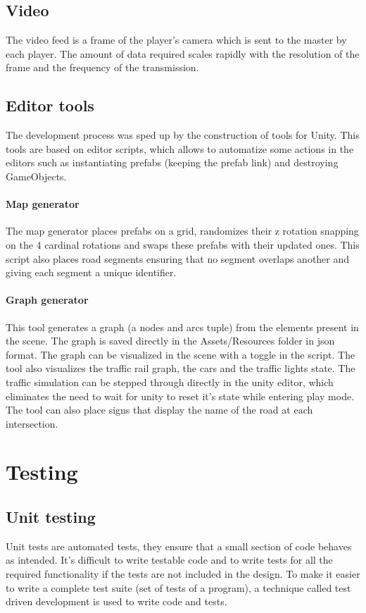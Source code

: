 \documentclass[12pt]{article}
\begin{document}
\subsection{Video}
The video feed is a frame of the player's camera which is sent to the master by each player. The amount of data required scales rapidly with the resolution of the frame and the frequency of the transmission.

\subsection{Editor tools}
The development process was sped up by the construction of tools for Unity. This tools are based on editor scripts, which allows to automatize some actions in the editors such as instantiating prefabs (keeping the prefab link) and destroying GameObjects.
\paragraph{Map generator}
The map generator places prefabs on a grid, randomizes their z rotation snapping on the 4 cardinal rotations and swaps these prefabs with their updated ones. This script also places road segments ensuring that no segment overlaps another and giving each segment a unique identifier.
\paragraph{Graph generator}
This tool generates a graph (a nodes and arcs tuple) from the elements present in the scene. The graph is saved directly in the Assets/Resources folder in json format. The graph can be visualized in the scene with a toggle in the script. The tool also visualizes the traffic rail graph, the cars and the traffic lights state. The traffic simulation can be stepped through directly in the unity editor, which eliminates the need to wait for unity to reset it's state while entering play mode. The tool can also place signs that display the name of the road at each intersection.

\clearpage

\section{Testing}
\subsection{Unit testing}
Unit tests are automated tests, they ensure that a small section of code behaves as intended. It's difficult to write testable code and to write tests for all the required functionality if the tests are not included in the design. To make it easier to write a complete test suite (set of tests of a program), a technique called test driven development is used to write code and tests.
\end{document}

